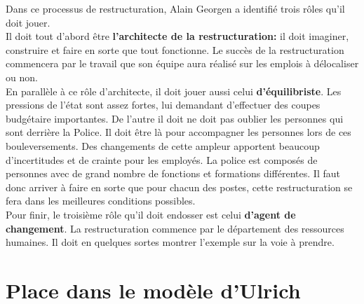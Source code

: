 \documentclass[12pt]{article}
\begin{document}


Dans ce processus de restructuration, Alain Georgen a identifié trois rôles qu'il doit jouer.\\
 Il doit tout d'abord être \textbf{l'architecte de la restructuration:} il doit imaginer, construire et faire en sorte que tout fonctionne. Le succès de la restructuration commencera par le travail que son équipe aura réalisé sur les emplois à délocaliser ou non. \\
 En parallèle à ce rôle d'architecte, il doit jouer aussi celui \textbf{d'équilibriste}. Les pressions de l'état sont assez fortes, lui demandant d'effectuer des coupes budgétaire importantes. De l'autre il doit ne doit pas oublier les personnes qui sont derrière la Police. Il doit être là pour accompagner les personnes lors de ces bouleversements. Des changements de cette ampleur apportent beaucoup d'incertitudes et de crainte pour les employés. La police est composés de personnes avec de grand nombre de fonctions et formations différentes. Il faut donc arriver à faire en sorte que pour chacun des postes, cette restructuration se fera dans les meilleures conditions possibles.\\
 Pour finir, le troisième rôle qu'il doit endosser est celui \textbf{d'agent de changement}. La restructuration commence par le département des ressources humaines. Il doit en quelques sortes montrer l'exemple sur la voie à prendre. 
 
\section{Place dans le modèle d'Ulrich}
\end{document}
